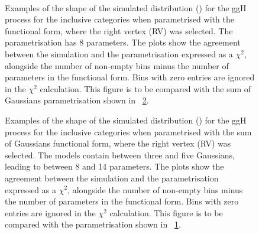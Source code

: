 \begin{figure}[htp!]
\centering
 \\
\caption{Examples of the shape of the simulated \mgg distribution (\GeV) for the ggH process for the inclusive categories when parametrised with the \DCBpG functional form, where the right vertex (RV) was selected. The \DCBpG parametrisation has 8 parameters. The plots show the agreement between the simulation and the parametrisation expressed as a $\chi^2$, alongside the number of non-empty bins minus the number of parameters in the functional form. Bins with zero entries are ignored in the $\chi^2$ calculation. This figure is to be compared with the sum of Gaussians parametrisation shown in \Fig~\ref{fig:model:functionalform_bis}.}

\label{fig:model:functionalform}
\end{figure}
\begin{figure}[htp!]
\centering
\caption{Examples of the shape of the simulated \mgg distribution (\GeV) for the ggH process for the inclusive categories when parametrised with the sum of Gaussians functional form, where the right vertex (RV) was selected. The models contain between three and five Gaussians, leading to between 8 and 14 parameters. The plots show the agreement between the simulation and the parametrisation expressed as a $\chi^2$, alongside the number of non-empty bins minus the number of parameters in the functional form. Bins with zero entries are ignored in the $\chi^2$ calculation. This figure is to be compared with the \DCBpG parametrisation shown in \Fig~\ref{fig:model:functionalform}.}

\label{fig:model:functionalform_bis}
\end{figure}

